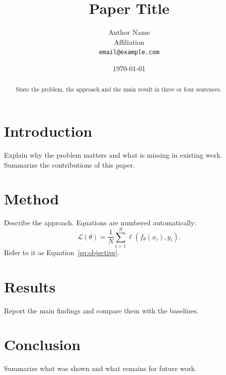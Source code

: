 \documentclass[11pt]{article}
\title{Paper Title}
\author{Author Name \\ Affiliation \\ \texttt{email@example.com}}
\date{\today}
\begin{document}
\maketitle

\begin{abstract}
State the problem, the approach and the main result in three or four sentences.
\end{abstract}

\section{Introduction}
\label{sec:intro}
Explain why the problem matters and what is missing in existing work.
Summarize the contributions of this paper.

\section{Method}
\label{sec:method}
Describe the approach. Equations are numbered automatically:
\begin{equation}
  \label{eq:objective}
  \mathcal{L}(\theta) = \frac{1}{N} \sum_{i=1}^{N} \ell\left(f_\theta(x_i), y_i\right).
\end{equation}
Refer to it as Equation~\eqref{eq:objective}.

\section{Results}
\label{sec:results}
Report the main findings and compare them with the baselines.

\section{Conclusion}
\label{sec:conclusion}
Summarize what was shown and what remains for future work.
\end{document}
